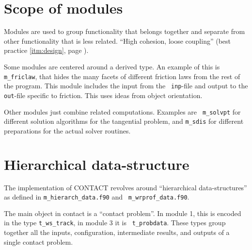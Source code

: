 \documentclass[12pt]{report}
\begin{document}
\section{Scope of modules}

Modules are used to group functionality that belongs together and separate
from other functionality that is less related. ``High cohesion, loose
coupling'' (best practice \ref{itm:design}, page \pageref{itm:design}).

Some modules are centered around a derived type. An example of this is {\tt
m\_friclaw}, that hides the many facets of different friction laws from the
rest of the program. This module includes the input from the {\tt
inp}-file and output to the {\tt out}-file specific to friction. This uses
ideas from object orientation.

Other modules just combine related computations. Examples are {\tt
m\_solvpt} for different solution algorithms for the tangential problem,
and {\tt m\_sdis} for different preparations for the actual solver
routines.

\section{Hierarchical data-structure}

The implementation of CONTACT revolves around ``hierarchical
data-structures'' as defined in {\tt m\_\-hie\-rarch\_\-data.f90} and {\tt
m\_wrprof\_data.f90}.

The main object in contact is a ``contact problem''. In module 1, this is
encoded in the type {\tt t\_ws\_\-track}, in module 3 it is {\tt
t\_probdata}. These types group together all the inputs, configuration,
intermediate results, and outputs of a single contact problem. 
\end{document}
